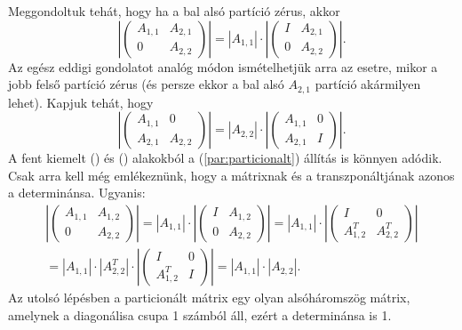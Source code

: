 \documentclass[9pt, a4paper, showtrims]{memoir}
\theoremstyle{plain}
\theoremstyle{remark}
\theoremstyle{definition}
\begin{document}
Meggondoltuk tehát, hogy ha a bal alsó partíció zérus, akkor
\[
    \left|
    \begin{pmatrix}
        A_{1,1}&A_{2,1}\\
        0&A_{2,2}
    \end{pmatrix}
    \right|
    =
    |A_{1,1}|\cdot
    \left|
    \begin{pmatrix}
        I&A_{2,1}\\
        0&A_{2,2}
    \end{pmatrix}
    \right|.\tag{\dag}
\]
Az egész eddigi gondolatot analóg módon ismételhetjük arra az esetre, 
mikor a jobb felső partíció zérus (és persze ekkor a bal alsó $A_{2,1}$ partíció akármilyen lehet).
Kapjuk tehát, hogy
\[
    \left|
    \begin{pmatrix}
        A_{1,1}&0\\
        A_{2,1}&A_{2,2}
    \end{pmatrix}
    \right|
    =
    |A_{2,2}|\cdot
    \left|
    \begin{pmatrix}
        A_{1,1}&0\\
        A_{2,1}&I
    \end{pmatrix}
    \right|.\tag{\ddag}
\]
A fent kiemelt (\dag) és (\ddag) alakokból a (\ref{par:particionalt}) állítás is könnyen adódik.
Csak arra kell még emlékeznünk, hogy a mátrixnak és a transzponáltjának azonos a determinánsa.
Ugyanis:
\begin{multline*}
    \left|
    \begin{pmatrix}
        A_{1,1}&A_{1,2}\\
        0&A_{2,2}
    \end{pmatrix}
    \right|
    =
    |A_{1,1}|\cdot
    \left|
    \begin{pmatrix}
        I&A_{1,2}\\
        0&A_{2,2}
    \end{pmatrix}
    \right|
    =
    |A_{1,1}|\cdot
    \left|
    \begin{pmatrix}
        I&0\\
        A_{1,2}^T&A_{2,2}^T
    \end{pmatrix}
    \right|
    \\
    =
    |A_{1,1}|\cdot |A_{2,2}^T|\cdot
    \left|
    \begin{pmatrix}
        I&0\\
        A_{1,2}^T&I
    \end{pmatrix}
    \right|
    =
    |A_{1,1}|\cdot |A_{2,2}|.
\end{multline*}
Az utolsó lépésben a particionált mátrix egy olyan alsóháromszög mátrix, amelynek a diagonálisa csupa 1 számból áll, ezért a determinánsa is 1.
\end{document}
